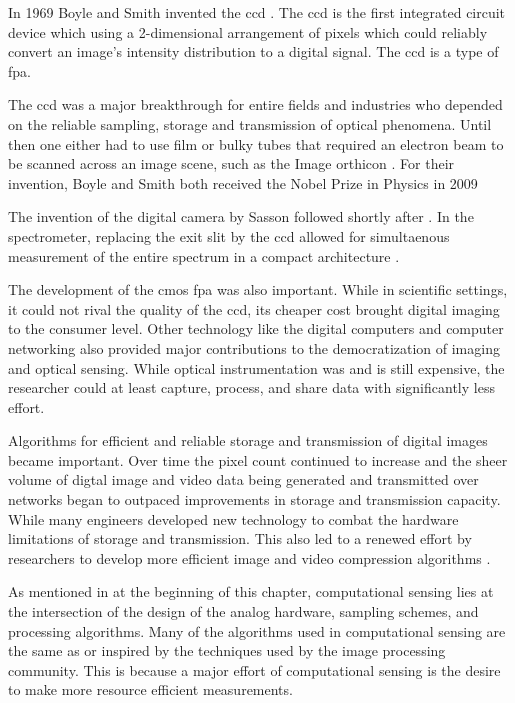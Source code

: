 In 1969 Boyle and Smith invented the \gls{ccd} \cite{boyle1970charge}. The \gls{ccd} is the first integrated circuit device which using a 2-dimensional arrangement of pixels which could reliably convert an image's intensity distribution to a digital signal. The \gls{ccd} is a type of \gls{fpa}. 

The \gls{ccd} was a major breakthrough for entire fields and industries who depended on the reliable sampling, storage and transmission of optical phenomena. Until then one either had to use film or bulky tubes that required an electron beam to be scanned across an image scene, such as the Image orthicon \cite{w1975image}. For their invention, Boyle and Smith both received the Nobel Prize in Physics in 2009 \cite{nobelprize2009physics}

The invention of the digital camera by Sasson followed shortly after \cite{kodaksfirstdigital2015}. In the spectrometer, replacing the exit slit by the \gls{ccd} allowed for simultaenous measurement of the entire spectrum in a compact architecture \cite{moore1979spectrometer}. 

The development of the \gls{cmos} \gls{fpa} was also important. While in scientific settings, it could not rival the quality of the \gls{ccd}, its cheaper cost brought digital imaging to the consumer level. Other technology like the digital computers and computer networking also provided major contributions to the democratization of imaging and optical sensing. While optical instrumentation was and is still expensive, the researcher could at least capture, process, and share data with significantly less effort. 

Algorithms for efficient and reliable storage and transmission of digital images became important. Over time the pixel count continued to increase and the sheer volume of digtal image and video data being generated and transmitted over networks began to outpaced improvements in storage and transmission capacity. While many engineers developed new technology to combat the hardware limitations of storage and transmission. This also led to a renewed effort by researchers to develop more efficient image and video compression algorithms \cite{kobayashi1974image, ziv1978compression}. 

As mentioned in at the beginning of this chapter, computational sensing lies at the intersection of the design of the analog hardware, sampling schemes, and processing algorithms. Many of the algorithms used in computational sensing are the same as or inspired by the techniques used by the image processing community. This is because a major effort of computational sensing is the desire to make more resource efficient measurements. 

